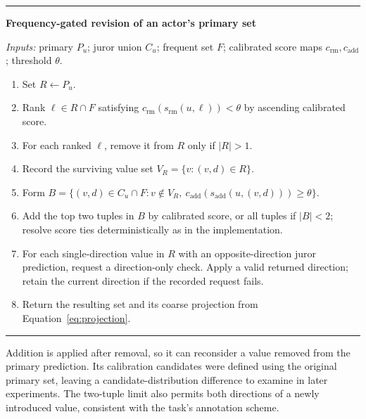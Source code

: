 \documentclass[12pt,a4paper]{article}
\begin{document}
\begin{algorithm}[htbp]
\centering
\begin{minipage}{0.96\textwidth}\small
\hrule\vspace{6pt}
\textbf{Frequency-gated revision of an actor's primary set}\par
\textit{Inputs:} primary $P_u$; juror union $C_u$; frequent set $F$; calibrated score maps $c_{\mathrm{rm}},c_{\mathrm{add}}$; threshold $\theta$.\par
\begin{enumerate}[label=\arabic*.,itemsep=4pt]
\item Set $R\leftarrow P_u$.
\item Rank $\ell\in R\cap F$ satisfying $c_{\mathrm{rm}}(s_{\mathrm{rm}}(u,\ell))<\theta$ by ascending calibrated score.
\item For each ranked $\ell$, remove it from $R$ only if $|R|>1$.
\item Record the surviving value set $V_R=\{v:(v,d)\in R\}$.
\item Form $B=\{(v,d)\in C_u\cap F:v\notin V_R,\ c_{\mathrm{add}}(s_{\mathrm{add}}(u,(v,d)))\geq\theta\}$.
\item Add the top two tuples in $B$ by calibrated score, or all tuples if $|B|<2$; resolve score ties deterministically as in the implementation.
\item For each single-direction value in $R$ with an opposite-direction juror prediction, request a direction-only check. Apply a valid returned direction; retain the current direction if the recorded request fails.
\item Return the resulting set and its coarse projection from Equation~\eqref{eq:projection}.
\end{enumerate}
\vspace{3pt}\hrule
\end{minipage}
\caption{The deployed decision logic. Step~6 uses the value set recorded at Step~4; it can admit both directions of a newly added value. Failure retention in Step~7 describes the historical run behavior.}
\label{alg:fusion}
\end{algorithm}

Addition is applied after removal, so it can reconsider a value removed from the primary prediction. Its calibration candidates were defined using the original primary set, leaving a candidate-distribution difference to examine in later experiments. The two-tuple limit also permits both directions of a newly introduced value, consistent with the task's annotation scheme.
\end{document}
